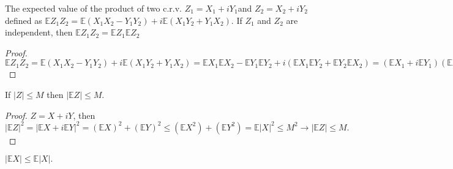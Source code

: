 \begin{proposition}
The expected value of the product of two c.r.v. $Z_1 = X_1 + iY_1$and $Z_2 = X_2 + iY_2$ defined as $\mathbb{E}Z_1Z_2 = \mathbb{E}(X_1X_2 - Y_1Y_2) + i\mathbb{E}(X_1Y_2+Y_1X_2)$. If $Z_1$ and $Z_2$ are independent, then $\mathbb{E}Z_1Z_2 = \mathbb{E}Z_1\mathbb{E}Z_2$ 
\end{proposition}
\begin{proof}
$\mathbb{E}Z_1Z_2 = \mathbb{E} (X_1X_2 - Y_1Y_2) + i\mathbb{E}(X_1Y_2+Y_1X_2) = \mathbb{E} X_1 \mathbb{E}X_2 - \mathbb{E}Y_1\mathbb{E}Y_2 + i(\mathbb{E}X_1\mathbb{E}Y_2 + \mathbb{E}Y_2\mathbb{E}X_2) = (\mathbb{E}X_1 + i\mathbb{E}Y_1)(\mathbb{E} X_2 + i\mathbb{E}Y_2) = \mathbb{E}Z_1\mathbb{E}Z_2.$
\end{proof}
\begin{proposition}
If $|Z| \le M$ then $|\mathbb{E}Z| \le M.$
\end{proposition}
\begin{proof}
$Z = X +iY$, then  $|\mathbb{E}Z|^2 = |\mathbb{E}X+i\mathbb{E}Y|^2 = (\mathbb{E}X)^2 + (\mathbb{E}Y)^2 \le (\mathbb{E}X^2) + (\mathbb{E}Y^2) = \mathbb{E}|X|^2 \le M^2 \rightarrow |\mathbb{E}Z| \le M.$
\end{proof}

\begin{rmrk}
$|\mathbb{E}X| \le \mathbb{E}|X|.$
\end{rmrk}

